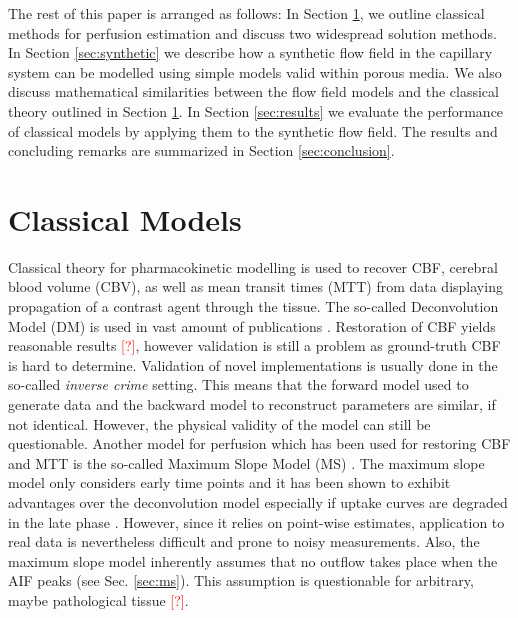 \documentclass[paper=a4, fontsize=11pt,parskip=half,headings=small]{scrartcl}
\newcommand{\missingsource}{\textcolor{red}{[?]}}
\begin{document}
	The rest of this paper is arranged as follows: In Section \ref{sec:classical}, we outline classical methods for perfusion estimation and discuss two widespread solution methods. 
	In Section \ref{sec:synthetic} we describe how a synthetic flow field in the capillary system can be modelled using simple models valid within porous media. 
	We also discuss mathematical similarities between the flow field models and the classical theory outlined in Section \ref{sec:classical}. 
	In Section \ref{sec:results} we evaluate the performance of classical models by applying them to the synthetic flow field. 
	The results and concluding remarks are summarized in Section \ref{sec:conclusion}.
	
	
	
	
	\section{Classical Models} \label{sec:classical}

	Classical theory for pharmacokinetic modelling is used to recover CBF, cerebral blood volume (CBV), as well as mean transit times (MTT) from data displaying propagation of a contrast agent through the tissue.
	The so-called Deconvolution Model (DM) is used in vast amount of publications \cite{ostergaard96,abels10,straka10,bivard13,sourbron13}.
	Restoration of CBF yields reasonable results \missingsource, however validation is still a problem as ground-truth CBF is hard to determine.
	Validation of novel implementations is usually done in the so-called \emph{inverse crime} setting. 
	This means that the forward model used to generate data and the backward model to reconstruct parameters are similar, if not identical. However, the physical validity of the model can still be questionable.
	Another model for perfusion which has been used for restoring CBF and MTT is the so-called Maximum Slope Model (MS) \cite{miles91,klotz99}.
	The maximum slope model only considers early time points and it has been shown to exhibit advantages over the deconvolution model especially if uptake curves are degraded in the late phase \cite{abels10}.
	However, since it relies on point-wise estimates, application to real data is nevertheless difficult and prone to noisy measurements.
	Also, the maximum slope model inherently assumes that no outflow takes place when the AIF peaks (see Sec. \ref{sec:ms}).
	This assumption is questionable for arbitrary, maybe pathological tissue \missingsource.
	
\end{document}
